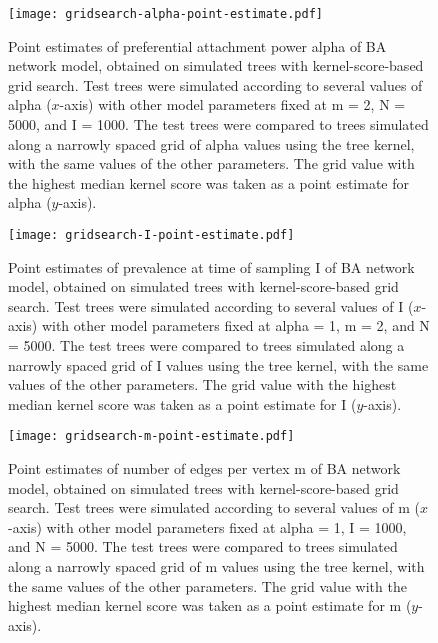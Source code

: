 \begin{figure}[ht]
  \centering
  \texttt{[image: gridsearch-alpha-point-estimate.pdf]}
  \caption[
      Point estimates of preferential attachment power \gls{alpha} of
      \acrlong{BA} network model, obtained on simulated trees with
      kernel-score-based grid search.]
  {
      Point estimates of preferential attachment power \gls{alpha} of
      \acrlong{BA} network model, obtained on simulated trees with
      kernel-score-based grid search. Test trees were simulated according to
      several values of \gls{alpha} ($x$-axis) with other model parameters
      fixed at \gls{m} = 2, \gls{N} = 5000, and \gls{I} = 1000. The test trees
      were compared to trees simulated along a narrowly spaced grid of
      \gls{alpha} values using the tree kernel, with the same values of the
      other parameters. The grid value with the highest median kernel score was
      taken as a point estimate for \gls{alpha} ($y$-axis).
  }
  \label{fig:gridptalpha}
\end{figure}

\begin{figure}[ht]
  \centering
  \texttt{[image: gridsearch-I-point-estimate.pdf]}
  \caption[ Point estimates of prevalence at time of sampling \gls{I} of
      \acrlong{BA} network model, obtained on simulated trees with
      kernel-score-based grid search. ]
  {
      Point estimates of prevalence at time of sampling \gls{I} of \acrlong{BA}
      network model, obtained on simulated trees with kernel-score-based grid
      search. Test trees were simulated according to several values of \gls{I}
      ($x$-axis) with other model parameters fixed at \gls{alpha} = 1, \gls{m}
      = 2, and \gls{N} = 5000. The test trees were compared to trees simulated
      along a narrowly spaced grid of \gls{I} values using the tree kernel,
      with the same values of the other parameters. The grid value with the
      highest median kernel score was taken as a point estimate for \gls{I}
      ($y$-axis).
  }
  \label{fig:gridptI}
\end{figure}

\begin{figure}[ht]
  \centering
  \texttt{[image: gridsearch-m-point-estimate.pdf]}
  \caption[
      Point estimates of number of edges per vertex \gls{m} of \acrlong{BA}
      network model, obtained on simulated trees with kernel-score-based grid
      search.
  ]
  {
      Point estimates of number of edges per vertex \gls{m} of \acrlong{BA}
      network model, obtained on simulated trees with kernel-score-based grid
      search. Test trees were simulated according to several values of \gls{m}
      ($x$-axis) with other model parameters fixed at \gls{alpha} = 1, \gls{I}
      = 1000, and \gls{N} = 5000. The test trees were compared to trees
      simulated along a narrowly spaced grid of \gls{m} values using the tree
      kernel, with the same values of the other parameters. The grid value with
      the highest median kernel score was taken as a point estimate for \gls{m}
      ($y$-axis).
  }
  \label{fig:gridptm}
\end{figure}

